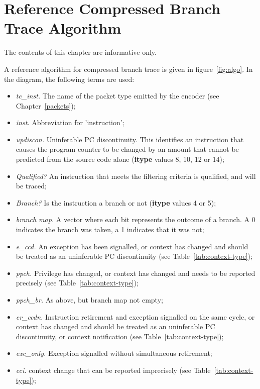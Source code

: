 \chapter{Reference Compressed Branch Trace Algorithm} \label{Algorithm}

The contents of this chapter are informative only.

A reference algorithm for compressed branch trace is given in figure~\ref{fig:algo}.  
In the diagram, the following terms are used:

\begin{itemize}
  \item \textit{te\_inst.} The name of the packet type emitted by the encoder (see Chapter~\ref{packets});
  \item \textit{inst.}  Abbreviation for 'instruction';
  \item \textit{updiscon.}  Uninferable PC discontinuity.  This identifies an instruction that
    causes the program counter to be changed by an amount that cannot be predicted from the
    source code alone (\textbf{itype} values 8, 10, 12 or 14);
  \item \textit{Qualified?}  An instruction that meets the filtering criteria is qualified, and will be traced;
  \item \textit{Branch?} Is the instruction a branch or not (\textbf{itype} values 4 or 5);
  \item \textit{branch map.}  A vector where each bit represents the outcome of a branch.  A 0 indicates the
    branch was taken, a 1 indicates that it was not;
  \item \textit{e\_ccd.} An exception has been signalled, or context has changed and
    should be treated as an uninferable PC discontinuity (see Table~\ref{tab:context-type});
  \item \textit{ppch.} Privilege has changed, or context has changed and needs to be 
    reported precisely (see Table~\ref{tab:context-type});
  \item \textit{ppch\_br.} As above, but branch map not empty;
  \item \textit{er\_ccdn.}  Instruction retirement and exception signalled on the same cycle, 
    or context has changed and should be treated as an uninferable PC discontinuity, or
    context notification (see Table~\ref{tab:context-type});
  \item \textit{exc\_only.}  Exception signalled without simultaneous retirement;
  \item \textit{cci.}  context change that can be reported imprecisely (see Table~\ref{tab:context-type});

\end{itemize}

